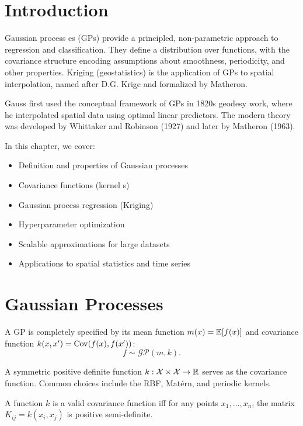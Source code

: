 \section{Introduction}

Gaussian process es (GPs) provide a principled, non-parametric approach to regression and classification. They define a distribution over functions, with the covariance structure encoding assumptions about smoothness, periodicity, and other properties. Kriging  (geostatistics) is the application of GPs to spatial interpolation, named after D.G. Krige and formalized by Matheron.

Gauss first used the conceptual framework of GPs in 1820s geodesy work, where he interpolated spatial data using optimal linear predictors. The modern theory was developed by Whittaker and Robinson (1927) and later by Matheron (1963).

In this chapter, we cover:
\begin{itemize}
    \item Definition and properties of Gaussian processes
    \item Covariance functions (kernel s)
    \item Gaussian process regression (Kriging)
    \item Hyperparameter optimization
    \item Scalable approximations for large datasets
    \item Applications to spatial statistics and time series
\end{itemize}

\section{Gaussian Processes}

A GP is completely specified by its mean function $m(x) = \mathbb{E}[f(x)]$ and covariance function  $k(x, x') = \operatorname{Cov}(f(x), f(x'))$:
\[
f \sim \mathcal{GP}(m, k).
\]

\begin{definition}
A symmetric positive definite function $k: \mathcal{X} \times \mathcal{X} \to \mathbb{R}$ serves as the covariance function. Common choices include the RBF, Matérn, and periodic kernels.
\end{definition}

\begin{theorem}
A function $k$ is a valid covariance function iff for any points $x_1, \ldots, x_n$, the matrix $K_{ij} = k(x_i, x_j)$ is positive semi-definite.
\end{theorem}

